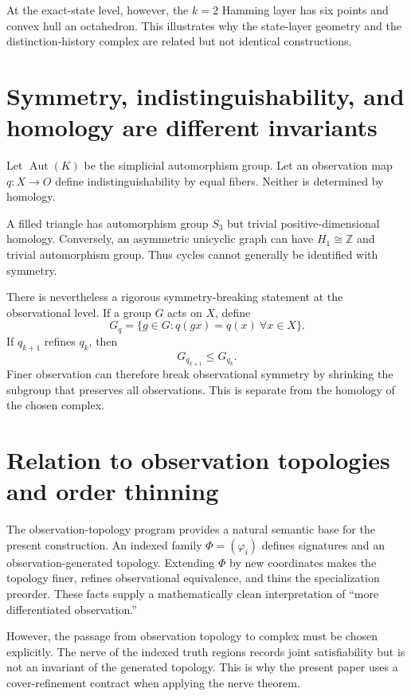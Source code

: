 \documentclass[11pt]{article}
\begin{document}
At the exact-state level, however, the $k=2$ Hamming layer has six points and convex hull an octahedron.  This illustrates why the state-layer geometry and the distinction-history complex are related but not identical constructions.

\section{Symmetry, indistinguishability, and homology are different invariants}

Let $\operatorname{Aut}(K)$ be the simplicial automorphism group.  Let an observation map $q:X\to O$ define indistinguishability by equal fibers.  Neither is determined by homology.

A filled triangle has automorphism group $S_3$ but trivial positive-dimensional homology.  Conversely, an asymmetric unicyclic graph can have $H_1\cong\mathbb Z$ and trivial automorphism group.  Thus cycles cannot generally be identified with symmetry.

There is nevertheless a rigorous symmetry-breaking statement at the observational level.  If a group $G$ acts on $X$, define
\[
G_q=\{g\in G:q(gx)=q(x)\ \forall x\in X\}.
\]
If $q_{k+1}$ refines $q_k$, then
\[
G_{q_{k+1}}\le G_{q_k}.
\]
Finer observation can therefore break observational symmetry by shrinking the subgroup that preserves all observations.  This is separate from the homology of the chosen complex.

\section{Relation to observation topologies and order thinning}

The observation-topology program provides a natural semantic base for the present construction.  An indexed family $\Phi=(\varphi_i)$ defines signatures and an observation-generated topology.  Extending $\Phi$ by new coordinates makes the topology finer, refines observational equivalence, and thins the specialization preorder.  These facts supply a mathematically clean interpretation of ``more differentiated observation.''

However, the passage from observation topology to complex must be chosen explicitly.  The nerve of the indexed truth regions records joint satisfiability but is not an invariant of the generated topology.  This is why the present paper uses a cover-refinement contract when applying the nerve theorem.
\end{document}
